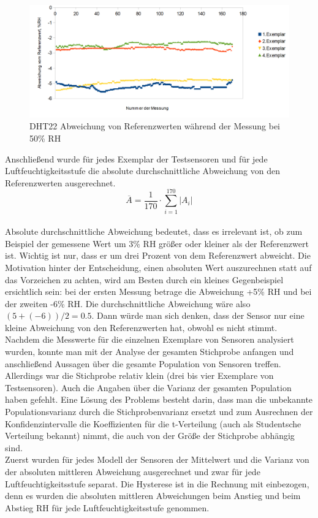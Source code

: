 \documentclass[runningheads]{llncs}
\begin{document}
\begin{figure}[h]
\includegraphics[width=\textwidth]{pictures/DHT22_50.png}
\caption{DHT22 Abweichung von Referenzwerten während der Messung bei 50\% RH}
\end{figure}

Anschließend wurde für jedes Exemplar der Testsensoren und für jede Luftfeuchtigkeitsstufe die absolute durchschnittliche Abweichung von den Referenzwerten ausgerechnet.
\begin{equation}
\overline{A}=\frac{1}{170}\cdot\sum_{i=1}^{170}|A_{i}| 
\label{formel2}
\end{equation}
\\Absolute durchschnittliche Abweichung bedeutet, dass es irrelevant ist, ob zum Beispiel der gemessene Wert um 3\% RH größer oder kleiner als der Referenzwert ist. Wichtig ist nur, dass er um drei Prozent von dem Referenzwert abweicht. Die Motivation hinter der Entscheidung, einen absoluten Wert auszurechnen statt auf das Vorzeichen zu achten, wird am Besten durch ein kleines Gegenbeispiel ersichtlich sein: bei der ersten Messung betrage die Abweichung +5\% RH und bei der zweiten -6\% RH. Die durchschnittliche Abweichung wäre also $(5+(-6))/2=0.5$. Dann würde man sich denken, dass der Sensor nur eine kleine Abweichung von den Referenzwerten hat, obwohl es nicht stimmt.
\\Nachdem die Messwerte für die einzelnen Exemplare von Sensoren analysiert wurden, konnte man mit der Analyse der gesamten Stichprobe anfangen und anschließend Aussagen über die gesamte Population von Sensoren treffen. Allerdings war die Stichprobe relativ klein (drei bis vier Exemplare von Testsensoren). Auch die Angaben über die Varianz der gesamten Population haben gefehlt. Eine Lösung des Problems besteht darin, dass man die unbekannte Populationsvarianz durch die Stichprobenvarianz ersetzt und zum Ausrechnen der Konfidenzintervalle die Koeffizienten für die t-Verteilung (auch als Studentsche Verteilung bekannt) nimmt, die auch von der Größe der Stichprobe abhängig sind.  
\\Zuerst wurden für jedes Modell der Sensoren der Mittelwert und die Varianz von der absoluten mittleren Abweichung ausgerechnet und zwar für jede Luftfeuchtigkeitsstufe separat. Die Hysterese ist in die Rechnung mit einbezogen, denn es wurden die absoluten mittleren Abweichungen beim Anstieg und beim Abstieg RH für jede Luftfeuchtigkeitsstufe genommen.
\end{document}
